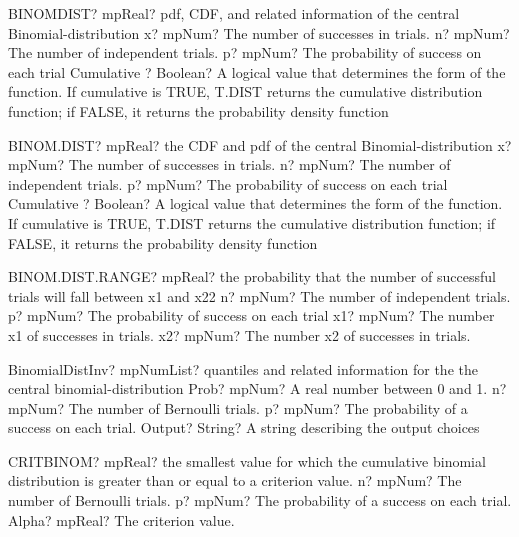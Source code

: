 \documentclass[12pt,a4paper,openany]{book}
\begin{document}
\begin{mpFunctionsExtract}
\mpWorksheetFunctionFourNotImplemented
{BINOMDIST? mpReal? pdf, CDF, and related information of the central Binomial-distribution}
{x? mpNum? The number of successes in trials.}
{n? mpNum? The number of independent trials.}
{p? mpNum? The probability of success on each trial}
{Cumulative ? Boolean? A logical value that determines the form of the function. If cumulative is TRUE, T.DIST returns the cumulative distribution function; if FALSE, it returns the probability density function}
\end{mpFunctionsExtract}

\begin{mpFunctionsExtract}
\mpWorksheetFunctionFourNotImplemented
{BINOM.DIST? mpReal? the CDF and pdf of the central Binomial-distribution}
{x? mpNum? The number of successes in trials.}
{n? mpNum? The number of independent trials.}
{p? mpNum? The probability of success on each trial}
{Cumulative ? Boolean? A logical value that determines the form of the function. If cumulative is TRUE, T.DIST returns the cumulative distribution function; if FALSE, it returns the probability density function}
\end{mpFunctionsExtract}

\begin{mpFunctionsExtract}
\mpWorksheetFunctionFourNotImplemented
{BINOM.DIST.RANGE? mpReal?  the probability that the number of successful trials will fall between x1 and x22}
{n? mpNum? The number of independent trials.}
{p? mpNum? The probability of success on each trial}
{x1? mpNum? The number x1 of successes in trials.}
{x2? mpNum? The number x2 of successes in trials.}
\end{mpFunctionsExtract}

\begin{mpFunctionsExtract}
\mpFunctionFourNotImplemented
{BinomialDistInv? mpNumList? quantiles and related information for the the central binomial-distribution}
{Prob? mpNum? A real number between 0 and 1.}
{n? mpNum? The number of Bernoulli trials.}
{p? mpNum? The probability of a success on each trial.}
{Output? String? A string describing the output choices}
\end{mpFunctionsExtract}

\begin{mpFunctionsExtract}
\mpWorksheetFunctionThreeNotImplemented
{CRITBINOM? mpReal? the smallest value for which the cumulative binomial distribution is greater than or equal to a criterion value.}
{n? mpNum? The number of Bernoulli trials.}
{p? mpNum? The probability of a success on each trial.}
{Alpha? mpReal? The criterion value.}
\end{mpFunctionsExtract}
\end{document}
